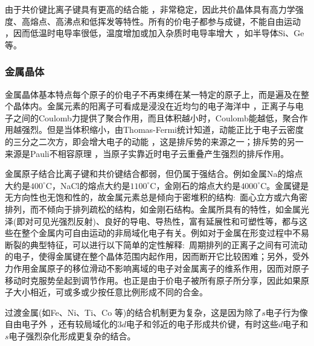 由于共价键比离子键具有更高的结合能 ，非常稳定，因此共价晶体具有高力学强度、高熔点、高沸点和低挥发等特性。所有的价电子都参与成键，不能自由运动 ，因而低温时电导率很低，温度增加或加入杂质时电导率增大 ，如半导体Si、Ge等。

\subsubsection{金属晶体} 
金属晶体基本特点每个原子的价电子不再束缚在某一特定的原子上，而是遍及在整个晶体内。金属元素的阳离子可看成是浸没在近均匀的电子海洋中 ，正离子与电子之间的Coulomb力提供了聚合作用，而且体积越小时，Coulomb能越低，聚合作用越强烈。但是当体积缩小，由Thomas-Fermi统计知道，动能正比于电子云密度的三分之二次方，即会增大电子的动能 ，这是排斥势的来源之一；排斥势的另一来源是Pauli不相容原理 ，当原子实靠近时电子云重叠产生强烈的排斥作用。

金属原子结合比离子键和共价键结合都弱，但仍属于强结合。例如金属Na的熔点大约是$400^{\circ}\mathrm{C}$，NaCl的熔点大约是$1100^{\circ}\mathrm{C}$，金刚石的熔点大约是$4000^{\circ}\mathrm{C}$。金属键是无方向性也无饱和性的，故金属元素总是倾向于密堆积的结构:~面心立方或六角密排列，而不倾向于排列疏松的结构，如金刚石结构。金属所具有的特性，如金属光泽(即对可见光强烈反射)、良好的导电、导热性，富有延展性和可塑性等，都与这些在整个金属内可自由运动的非局域化电子有关。例如对于金属在形变过程中不易断裂的典型特征，可以进行以下简单的定性解释:~周期排列的正离子之间有可流动的电子，使得金属键在整个晶体范围内起作用，因而断开它比较困难；另外，受外力作用金属原子的移位滑动不影响离域的电子对金属离子的维系作用，因而对原子移动时克服势垒起到调节作用。也正是由于价电子被所有原子所分享，因此如果原子大小相近，可或多或少按任意比例形成不同的合金。

过渡金属(如Fe、Ni、Ti、Co 等)的结合机制更为复杂，这是因为除了$s$电子行为像自由电子外 ，还有较局域化的$3d$电子和邻近的电子形成共价键，有时这些$d$电子和$s$电子强烈杂化形成更复杂的结合。

